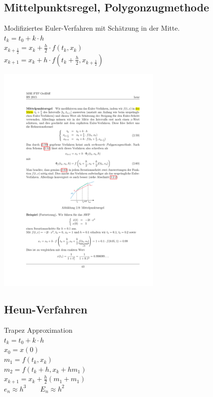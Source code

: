 \begin{minipage}{0.6\linewidth}
    \subsection{Mittelpunktsregel, Polygonzugmethode}
     Modifiziertes Euler-Verfahren mit Schätzung in der Mitte. \\
     $t_k = t_0 + k \cdot h$ \\
     $x_{k+\frac{1}{2}} = x_k + \frac{h}{2} \cdot f(t_k, x_k)$ \\
     $x_{k+1} = x_k + h \cdot f(t_k + \frac{h}{2}, x_{k+\frac{1}{2}})$ \\
\end{minipage}
\begin{minipage}{0.4\linewidth}
	\includegraphics[width= 0.6\textwidth]{images/mittelpunkt.pdf}
\end{minipage}
\begin{minipage}{0.6\linewidth}
    \subsection{Heun-Verfahren}
    Trapez Approximation \\
    $t_k = t_0 + k  \cdot h$ \\
    $x_0 = x(0)$ \\
    $m_1 = f(t_k, x_k)$ \\
    $m_2 = f(t_k + h, x_k + hm_1)$\\
    $x_{k+1} = x_k + \frac{h}{2}(m_1 + m_1)$\\
    $e_n  \approx h^3 \qquad E_n \approx h^2$\\
\end{minipage}
